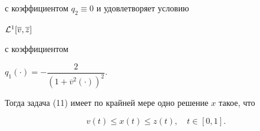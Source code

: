 \begin{exam}
с коэффициентом $q_2\equiv 0$ и удовлетворяет условию


${\cal L}^1[\overline {v},\overline {z}]$


с коэффициентом


$q_1(\cdot)=-\dfrac{2}{(1+\overline {v}^2(\cdot))^2}$.





Тогда задача (11) имеет по крайней мере одно решение $x$ такое, что


$$


v(t)\le x(t)\le z(t), \quad t\in[0,1].


$$


\end{exam}





